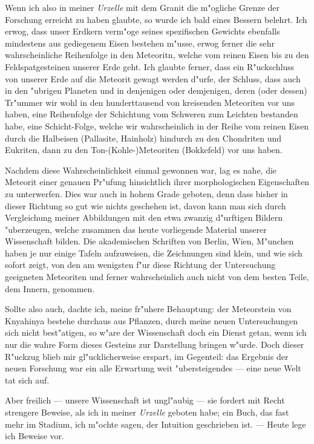 \documentclass[a4paper, 11pt, oneside]{article}
\begin{document}
Wenn ich also in meiner \emph{Urzelle} mit dem Granit die m"ogliche Grenze der Forschung erreicht zu haben glaubte, so wurde ich bald eines Bessern belehrt. Ich erwog, dass unser Erdkern verm"oge seines spezifischen Gewichts ebenfalls mindestens aus gediegenem Eisen bestehen m"usse, erwog ferner die sehr wahrscheinliche Reihenfolge in den Meteoritn, welche vom reinen Eisen bis zu den Feldspatgesteinen unserer Erde geht. Ich glaubte ferner, dass ein R"uckschluss von unserer Erde auf die Meteorit gewagt werden d"urfe, der Schluss, dass auch in den "ubrigen Planeten und in denjenigen oder demjenigen, deren (oder dessen) Tr"ummer wir wohl in den hunderttausend von kreisenden Meteoriten vor uns haben, eine Reihenfolge der Schichtung vom Schweren zum Leichten bestanden habe, eine Schicht-Folge, welche wir wahrscheinlich in der Reihe vom reinen Eisen durch die Halbeisen (Pallasite, Hainholz) hindurch zu den Chondriten und Eukriten, dann zu den Ton-(Kohle-)Meteoriten (Bokkefeld) vor uns haben.

Nachdem diese Wahrscheinlichkeit einmal gewonnen war, lag es nahe, die Meteorit einer genauen Pr"ufung hinsichtlich ihrer morphologischen Eigenschaften zu unterwerfen. Dies war auch in hohem Grade geboten, denn dass bisher in dieser Richtung so gut wie nichts geschehen ist, davon kann man sich durch Vergleichung meiner Abbildungen mit den etwa zwanzig d"urftigen Bildern "uberzeugen, welche zusammen das heute vorliegende Material unserer Wissenschaft bilden. Die akademischen Schriften von Berlin, Wien, M"unchen haben je nur einige Tafeln aufzuweisen, die Zeichnungen sind klein, und wie sich sofort zeigt, von den am wenigsten f"ur diese Richtung der Untersuchung geeigneten Meteoriten und ferner wahrscheinlich auch nicht von dem besten Teile, dem Innern, genommen.

Sollte also auch, dachte ich, meine fr"uhere Behauptung: der Meteorstein von Knyahinya bestehe durchaus aus Pflanzen, durch meine neuen Untersuchungen sich nicht best"atigen, so w"are der Wissenschaft doch ein Dienst getan, wenn ich nur die wahre Form dieses Gesteins zur Darstellung bringen w"urde. Doch dieser R"uckzug blieb mir gl"ucklicherweise erspart, im Gegenteil: das Ergebnis der neuen Forschung war ein alle Erwartung weit "ubersteigendes --- eine neue Welt tat sich auf.

Aber freilich --- unsere Wissenschaft ist ungl"aubig --- sie fordert mit Recht strengere Beweise, als ich in meiner \emph{Urzelle} geboten habe; ein Buch, das fast mehr im Stadium, ich m"ochte sagen, der Intuition geschrieben ist. --- Heute lege ich Beweise vor.
\end{document}
